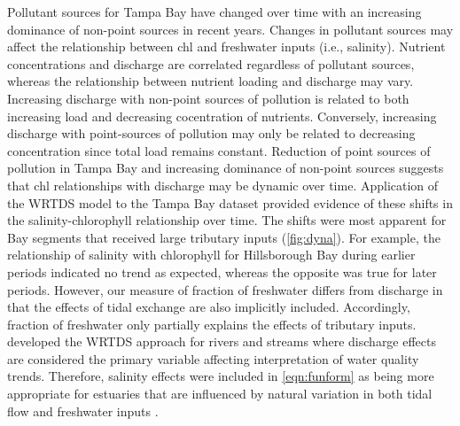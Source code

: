 \documentclass[letterpaper,12pt,oneside]{article}\usepackage[]{graphicx}\usepackage[]{color}
\begin{document}
Pollutant sources for Tampa Bay have changed over time with an increasing dominance of non-point sources in recent years.  Changes in pollutant sources may affect the relationship between \ac{chl} and freshwater inputs (i.e., salinity).  Nutrient concentrations and discharge are correlated regardless of pollutant sources, whereas the relationship between nutrient loading and discharge may vary.  Increasing discharge with non-point sources of pollution is related to both increasing load and decreasing cocentration of nutrients.  Conversely, increasing discharge with point-sources of pollution may only be related to decreasing concentration since total load remains constant. Reduction of point sources of pollution in Tampa Bay and increasing dominance of non-point sources suggests that \ac{chl} relationships with discharge may be dynamic over time.  Application of the \ac{WRTDS} model to the Tampa Bay dataset provided evidence of these shifts in the salinity-chlorophyll relationship over time.  The shifts were most apparent for Bay segments that received large tributary inputs (\cref{fig:dyna}). For example, the relationship of salinity with chlorophyll for Hillsborough Bay during earlier periods indicated no trend as expected, whereas the opposite was true for later periods.  However, our measure of fraction of freshwater differs from discharge in that the effects of tidal exchange are also implicitly included.  Accordingly, fraction of freshwater only partially explains the effects of tributary inputs.  \citet{Hirsch10} developed the \ac{WRTDS} approach for rivers and streams where discharge effects are considered the primary variable affecting interpretation of water quality trends.  Therefore, salinity effects were included in \cref{eqn:funform} as being more appropriate for estuaries that are influenced by natural variation in both tidal flow and freshwater inputs \citep{Cloern96}.
\end{document}

